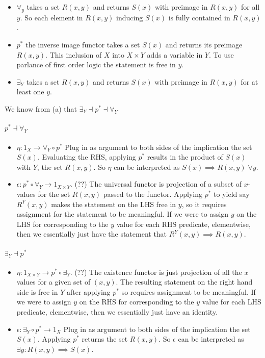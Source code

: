 \documentclass{article}
\begin{document}
\begin {itemize}

\item $\forall_y$ takes a set $R(x,y)$ and returns $S(x)$ with preimage in $R(x,y)$ for all $y$. So each element in $R(x,y)$ inducing $S(x)$ is fully contained in $R(x,y)$.
\item $p^*$ the inverse image functor takes a set $S(x)$ and returns its preimage $R(x,y)$. This inclusion
  of $X$ into $X \times Y$ adds a variable in $Y$. To use parlance of first order logic the statement is free in $y$.
\item $\exists_Y$ takes a set $R(x,y)$ and returns $S(x)$ with preimage in $R(x,y)$ for at least one $y$.
\end{itemize}

We know from (a) that $\exists_Y \dashv p^* \dashv \forall_Y $

\paragraph{$p^* \dashv \forall_Y$}

\begin{itemize}
\item $\eta: 1_X \rightarrow  \forall_Y \circ p^*$ Plug in as argument to both sides of the implication the set $S(x)$. Evaluating the RHS, applying $p^*$ results in the product of $S(x)$ with $Y$, the set $R(x,y)$. So $\eta$ can be interpreted as $S(x) \implies R(x,y) \; \forall y$.
\item $\epsilon: p^* \circ \forall_Y \rightarrow 1_{X \times Y}$. (??) The universal functor is projection of a subset of $x$-values for the set $R(x,y)$ passed to the functor. Applying $p^*$ to yield say $R^Y(x,y)$ makes the statement on the LHS free in $y$, so it requires assignment for the statement to be meaningful. If we were to assign $y$ on the LHS for corresponding to the $y$ value for each RHS predicate, elementwise, then we essentially just have the statement that $R^Y(x,y) \implies R(x,y)$.
\end{itemize}

\paragraph{$\exists_Y \dashv p^*$}

\begin{itemize}
\item $\eta: 1_{X \times Y} \rightarrow   p^* \circ \exists_Y$.  (??) The existence functor is just projection of all the $x$ values for a given set of $(x,y)$. The resulting statement on the right hand side is free in $Y$ after applying $p^*$ so requires assignment to be meaningful. If we were to assign $y$ on the RHS for corresponding to the $y$ value for each LHS predicate, elementwise, then we essentially just have an identity.
\item $\epsilon: \exists_Y \circ p^* \rightarrow 1_X $ Plug in as argument to both sides of the implication the set $S(x)$. Applying $p^*$ returns the set $R(x,y)$. So $\epsilon$ can be interpreted as $\exists y: R(x,y) \implies S(x)$.
\end{itemize}
\end{document}
